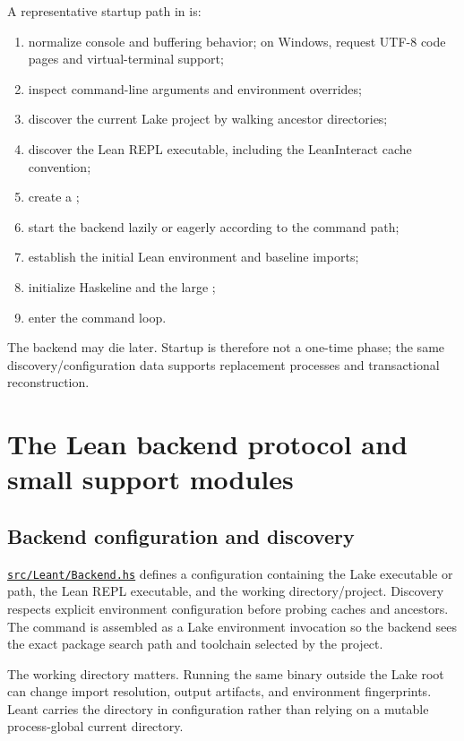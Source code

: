 \documentclass[10pt,letterpaper,oneside]{report}
\newcommand{\code}[1]{\texttt{\detokenize{#1}}}
\def\LeantBase{https://github.com/VladimirReshetnikov/Leant/blob/ada69d884480b93e74ee4b3daf77be38702ee07d/}
\newcommand{\lpath}[1]{\href{\LeantBase#1}{\nolinkurl{#1}}}
\begin{document}
A representative startup path in \code{Main.hs} is:

\begin{enumerate}
  \item normalize console and buffering behavior; on Windows, request UTF-8 code pages and virtual-terminal support;
  \item inspect command-line arguments and environment overrides;
  \item discover the current Lake project by walking ancestor directories;
  \item discover the Lean REPL executable, including the LeanInteract cache convention;
  \item create a \code{BackendConfig};
  \item start the backend lazily or eagerly according to the command path;
  \item establish the initial Lean environment and baseline imports;
  \item initialize Haskeline and the large \code{ReplState};
  \item enter the command loop.
\end{enumerate}

The backend may die later. Startup is therefore not a one-time phase; the same discovery/configuration data supports replacement processes and transactional reconstruction.

\chapter{The Lean backend protocol and small support modules}\label{ch:leant-backend}

\section{Backend configuration and discovery}

\lpath{src/Leant/Backend.hs} defines a configuration containing the Lake executable or path, the Lean REPL executable, and the working directory/project. Discovery respects explicit environment configuration before probing caches and ancestors. The command is assembled as a Lake environment invocation so the backend sees the exact package search path and toolchain selected by the project.

The working directory matters. Running the same binary outside the Lake root can change import resolution, output artifacts, and environment fingerprints. Leant carries the directory in configuration rather than relying on a mutable process-global current directory.
\end{document}
